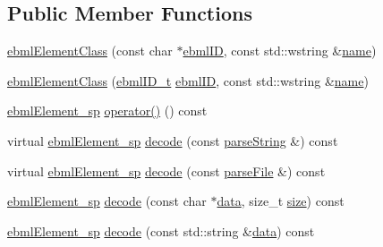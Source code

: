 \subsection*{Public Member Functions}
\begin{DoxyCompactItemize}
\item 
\mbox{\hyperlink{classebml_1_1ebmlElementClass_a6c2081870c5d66c70e0cf988ff253420}{ebml\+Element\+Class}} (const char $\ast$\mbox{\hyperlink{classebml_1_1ebmlElementClass_a7d8337c9f9b884b43e1618b9392519b6}{ebml\+ID}}, const std\+::wstring \&\mbox{\hyperlink{classebml_1_1ebmlElementClass_aba4096c056179fb989da05d86f4cb46d}{name}})
\item 
\mbox{\hyperlink{classebml_1_1ebmlElementClass_a9ea21779aa5db15a70df73a03a873aa8}{ebml\+Element\+Class}} (\mbox{\hyperlink{namespaceebml_a86c5f604ddf12a74aa9812e997a58691}{ebml\+I\+D\+\_\+t}} \mbox{\hyperlink{classebml_1_1ebmlElementClass_a7d8337c9f9b884b43e1618b9392519b6}{ebml\+ID}}, const std\+::wstring \&\mbox{\hyperlink{classebml_1_1ebmlElementClass_aba4096c056179fb989da05d86f4cb46d}{name}})
\item 
\mbox{\hyperlink{namespaceebml_adad533b7705a16bb360fe56380c5e7be}{ebml\+Element\+\_\+sp}} \mbox{\hyperlink{classebml_1_1ebmlElementClass_a45bdca04f3008152ad7df0856ef8724b}{operator()}} () const
\item 
virtual \mbox{\hyperlink{namespaceebml_adad533b7705a16bb360fe56380c5e7be}{ebml\+Element\+\_\+sp}} \mbox{\hyperlink{classebml_1_1ebmlElementClass_a9bda26f54e5d5a1e27aaaf0e124ec457}{decode}} (const \mbox{\hyperlink{classebml_1_1parseString}{parse\+String}} \&) const
\item 
virtual \mbox{\hyperlink{namespaceebml_adad533b7705a16bb360fe56380c5e7be}{ebml\+Element\+\_\+sp}} \mbox{\hyperlink{classebml_1_1ebmlElementClass_a94461f09e1c1c57ffe86febb9710edc7}{decode}} (const \mbox{\hyperlink{classebml_1_1parseFile}{parse\+File}} \&) const
\item 
\mbox{\hyperlink{namespaceebml_adad533b7705a16bb360fe56380c5e7be}{ebml\+Element\+\_\+sp}} \mbox{\hyperlink{classebml_1_1ebmlElementClass_ac24711e997db80f691a8bff4f610242f}{decode}} (const char $\ast$\mbox{\hyperlink{namespaceebml_a6365629b3110a3c5d0cde94d08aac26c}{data}}, size\+\_\+t \mbox{\hyperlink{namespaceebml_a75eaf24de9c90584c60e27de3b1dd63e}{size}}) const
\item 
\mbox{\hyperlink{namespaceebml_adad533b7705a16bb360fe56380c5e7be}{ebml\+Element\+\_\+sp}} \mbox{\hyperlink{classebml_1_1ebmlElementClass_a2e45d73cfc2bfda5b4731af42299aaf1}{decode}} (const std\+::string \&\mbox{\hyperlink{namespaceebml_a6365629b3110a3c5d0cde94d08aac26c}{data}}) const

\end{DoxyCompactItemize}
